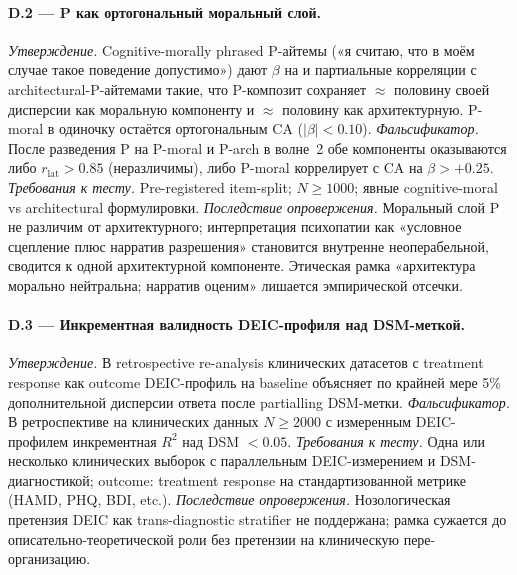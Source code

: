 \paragraph{D.2 --- P как ортогональный моральный слой.}
\emph{Утверждение.} Cognitive-morally phrased P-айтемы («я считаю, что в моём случае такое поведение допустимо») дают $\beta$ на \EAF{} и партиальные корреляции с architectural-P-айтемами такие, что P-композит сохраняет $\approx$ половину своей дисперсии как моральную компоненту и $\approx$ половину как архитектурную. P-moral в одиночку остаётся ортогональным CA ($|\beta| < 0.10$).
\emph{Фальсификатор.} После разведения P на P-moral и P-arch в волне~2 обе компоненты оказываются либо $r_{\mathrm{lat}} > 0.85$ (неразличимы), либо P-moral коррелирует с CA на $\beta > +0.25$.
\emph{Требования к тесту.} Pre-registered item-split; $N \geq 1000$; явные cognitive-moral vs architectural формулировки.
\emph{Последствие опровержения.} Моральный слой P не различим от архитектурного; интерпретация психопатии как «условное сцепление плюс нарратив разрешения» становится внутренне неоперабельной, сводится к одной архитектурной компоненте. Этическая рамка «архитектура морально нейтральна; нарратив оценим» лишается эмпирической отсечки.

\paragraph{D.3 --- Инкрементная валидность DEIC-профиля над DSM-меткой.}
\emph{Утверждение.} В retrospective re-analysis клинических датасетов с treatment response как outcome DEIC-профиль на baseline объясняет по крайней мере 5\% дополнительной дисперсии ответа после partialling DSM-метки.
\emph{Фальсификатор.} В ретроспективе на клинических данных $N \geq 2000$ с измеренным DEIC-профилем инкрементная $R^2$ над DSM $< 0.05$.
\emph{Требования к тесту.} Одна или несколько клинических выборок с параллельным DEIC-измерением и DSM-диагностикой; outcome: treatment response на стандартизованной метрике (HAMD, PHQ, BDI, etc.).
\emph{Последствие опровержения.} Нозологическая претензия DEIC как trans-diagnostic stratifier не поддержана; рамка сужается до описательно-теоретической роли без претензии на клиническую пере-организацию.

